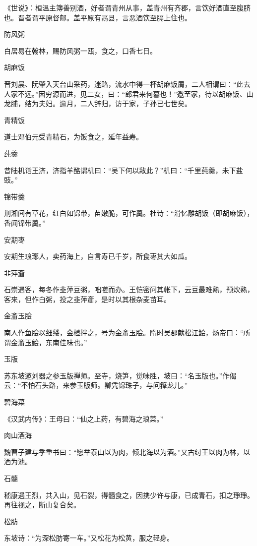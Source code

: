 \documentclass[a4paper,12pt,UTF8,twoside]{ctexbook}
\begin{document}
    《世说》：桓温主簿善别酒，好者谓青州从事，盖青州有齐郡，言饮好酒直至腹脐也。晋者谓平原督邮。盖平原有鬲县，言恶酒饮至膈上住也。
    
    防风粥
    
    白居易在翰林，赐防风粥一瓯，食之，口香七日。
    
    胡麻饭
    
    晋刘晨、阮肇入天台山采药，迷路，流水中得一杯胡麻饭屑，二人相谓曰：“此去人家不远。”因穷源而进，见二女，曰：“郎君来何暮也！”邀至家，待以胡麻饭、山龙脯，结为夫妇。逾月，二人辞归，访于家，子孙已七世矣。
    
    青精饭
    
    道士邓伯元受青精石，为饭食之，延年益寿。
    
    莼羹
    
    昔陆机诣王济，济指羊酪谓机曰：“吴下何以敌此？”机曰：“千里莼羹，未下盐豉。”
    
    锦带羹
    
    荆湘间有草花，红白如锦带，苗嫩脆，可作羹。杜诗：“滑忆雕胡饭（即胡麻饭），香闻锦带羹。”
    
    安期枣
    
    安期生琅琊人，卖药海上，自言寿已千岁，所食枣其大如瓜。
    
    韭萍齑
    
    石崇遇客，每冬作韭萍豆粥，咄嗟而办。王恺密问其帐下，云豆最难熟，预炊熟，客来，但作白粥，投之韭萍齑，是时以其根杂麦苗耳。
    
    金齑玉脍
    
    南人作鱼脍以细缕，金橙拌之，号为金齑玉脍。隋时吴郡献松江鲙，炀帝曰：“所谓金齑玉鲙，东南佳味也。”
    
    玉版
    
    苏东坡邀刘器之参玉版禅师。至寺，烧笋，觉味胜，坡曰：“名玉版也。”作偈云：“不怕石头路，来参玉版师。卿凭锦珠子，与问箨龙儿。”
    
    碧海菜
    
    《汉武内传》：王母曰：“仙之上药，有碧海之琅菜。”
    
    肉山酒海
    
    魏曹子建与季重书曰：“愿举泰山以为肉，倾北海以为酒。”又古纣王以肉为林，以酒为池。
    
    石髓
    
    嵇康遇王烈，共入山，见石裂，得髓食之，因携少许与康，已成青石，扣之琤琤。再往视之，断山复合矣。
    
    松肪
    
    东坡诗：“为深松肪寄一车。”又松花为松黄，服之轻身。
    
\end{document}
